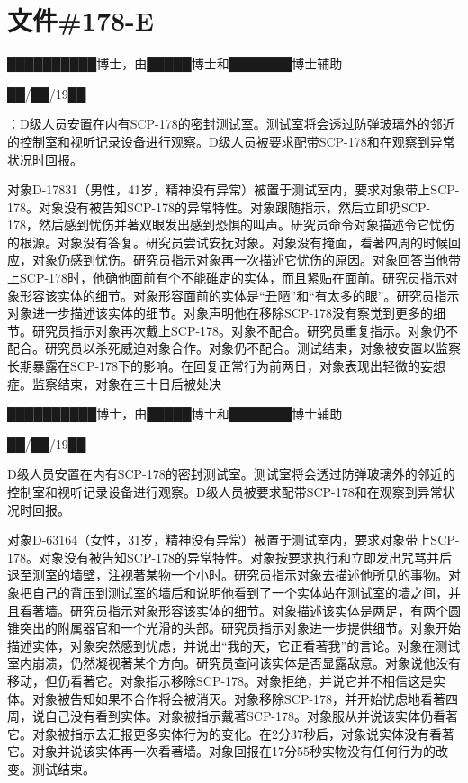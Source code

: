 \section{文件\#178-E}

\label{sec:DOC-scp-178-log}


\hr


██████████博士，由█████博士和███████博士辅助

██\slash ██\slash 19██

：D级人员安置在内有SCP-178的密封测试室。测试室将会透过防弹玻璃外的邻近的控制室和视听记录设备进行观察。D级人员被要求配带SCP-178和在观察到异常状况时回报。

对象D-17831（男性，41岁，精神没有异常）被置于测试室内，要求对象带上SCP-178。对象没有被告知SCP-178的异常特性。对象跟随指示，然后立即扔SCP-178，然后感到忧伤并著双眼发出感到恐惧的叫声。研究员命令对象描述令它忧伤的根源。对象没有答复。研究员尝试安抚对象。对象没有掩面，看著四周的时候回应，对象仍感到忧伤。研究员指示对象再一次描述它忧伤的原因。对象回答当他带上SCP-178时，他确他面前有个不能碓定的实体，而且紧贴在面前。研究员指示对象形容该实体的细节。对象形容面前的实体是“丑陋”和“有太多的眼”。研究员指示对象进一步描述该实体的细节。对象声明他在移除SCP-178没有察觉到更多的细节。研究员指示对象再次戴上SCP-178。对象不配合。研究员重复指示。对象仍不配合。研究员以杀死威迫对象合作。对象仍不配合。测试结束，对象被安置以监察长期暴露在SCP-178下的影响。在回复正常行为前两日，对象表现出轻微的妄想症。监察结束，对象在三十日后被处决


\hr


██████████博士，由█████博士和███████博士辅助

██\slash ██\slash 19██

D级人员安置在内有SCP-178的密封测试室。测试室将会透过防弹玻璃外的邻近的控制室和视听记录设备进行观察。D级人员被要求配带SCP-178和在观察到异常状况时回报。

对象D-63164（女性，31岁，精神没有异常）被置于测试室内，要求对象带上SCP-178。对象没有被告知SCP-178的异常特性。对象按要求执行和立即发出咒骂并后退至测室的墙壁，注视著某物一个小时。研究员指示对象去描述他所见的事物。对象把自己的背压到测试室的墙后和说明他看到了一个实体站在测试室的墙之间，并且看著墙。研究员指示对象形容该实体的细节。对象描述该实体是两足，有两个圆锥突出的附属器官和一个光滑的头部。研究员指示对象进一步提供细节。对象开始描述实体，对象突然感到忧虑，并说出“我的天，它正看著我”的言论。对象在测试室内崩溃，仍然凝视著某个方向。研究员查问该实体是否显露敌意。对象说他没有移动，但仍看著它。对象指示移除SCP-178。对象拒绝，并说它并不相信这是实体。对象被告知如果不合作将会被消灭。对象移除SCP-178，并开始忧虑地看著四周，说自己没有看到实体。对象被指示戴著SCP-178。对象服从并说该实体仍看著它。对象被指示去汇报更多实体行为的变化。在2分37秒后，对象说实体没有看著它。对象并说该实体再一次看著墙。对象回报在17分55秒实物没有任何行为的改变。测试结束。

